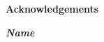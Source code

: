 \begin{center}
{\LARGE \bf Acknowledgements}
\end{center}
\begin{flushright}
\textit{\textbf{Name}}
\end{flushright}



